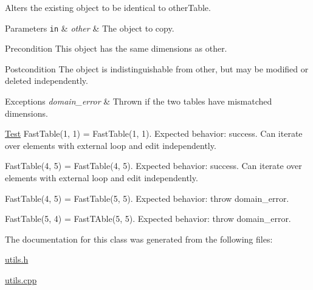 Alters the existing object to be identical to otherTable. 


\begin{DoxyParams}[1]{Parameters}
\mbox{\tt in}  & {\em other} & The object to copy.\\
\hline
\end{DoxyParams}
\begin{DoxyPrecond}{Precondition}
This object has the same dimensions as other. 
\end{DoxyPrecond}
\begin{DoxyPostcond}{Postcondition}
The object is indistinguishable from other, but may be modified or deleted independently.
\end{DoxyPostcond}

\begin{DoxyExceptions}{Exceptions}
{\em domain\_\-error} & Thrown if the two tables have mismatched dimensions.\\
\hline
\end{DoxyExceptions}
\begin{Desc}
\item[\hyperlink{test__test000007}{Test}]FastTable(1, 1) = FastTable(1, 1). Expected behavior: success. Can iterate over elements with external loop and edit independently. 

FastTable(4, 5) = FastTable(4, 5). Expected behavior: success. Can iterate over elements with external loop and edit independently. 

FastTable(4, 5) = FastTable(5, 5). Expected behavior: throw domain\_\-error. 

FastTable(5, 4) = FastTAble(5, 5). Expected behavior: throw domain\_\-error. \end{Desc}


The documentation for this class was generated from the following files:\begin{DoxyCompactItemize}
\item 
\hyperlink{utils_8h}{utils.h}\item 
\hyperlink{utils_8cpp}{utils.cpp}\end{DoxyCompactItemize}
